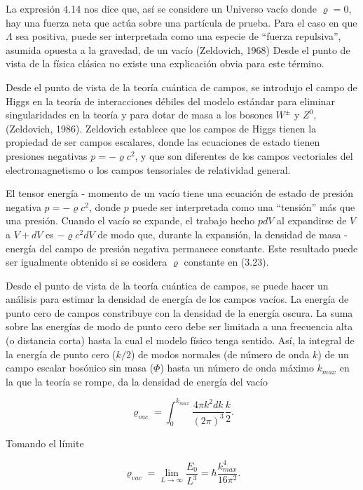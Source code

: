 \documentclass[11pt]{article}
\begin{document}
    La expresión 4.14 nos dice que, así se considere un Universo vacío donde $\varrho=0$, hay una fuerza neta que actúa sobre una partícula de prueba. Para el caso en que $\Lambda$ sea positiva, puede ser interpretada como una especie de ``fuerza repulsiva'', asumida opuesta a la gravedad, de un vacío (Zeldovich, 1968) Desde el punto de vista de la física clásica no existe una explicación obvia para este término. 
    
    Desde el punto de vista de la teoría cuántica de campos, se introdujo el campo de Higgs en la teoría de interacciones débiles del modelo estándar para eliminar singularidades en la teoría y para dotar de masa a los bosones $W^{\pm}$ y $Z^0$,  (Zeldovich, 1986).  Zeldovich establece que los campos de Higgs tienen la propiedad de ser campos escalares, donde las ecuaciones de estado tienen presiones negativas $p=- \varrho c^2$, y que son diferentes de los campos vectoriales del electromagnetismo o los campos tensoriales de relatividad general. 
    
    El tensor energía - momento de un vacío tiene una ecuación de estado de presión negativa $p=- \varrho c^2$, donde $p$ puede ser interpretada como una ``tensión'' más que una presión. Cuando el vacío se expande, el trabajo hecho $p dV$  al expandirse de $V$ a $V + dV$ es $- \varrho c^2 dV$ de modo que, durante la expansión, la densidad de masa - energía del campo de presión negativa permanece constante. Este resultado puede ser igualmente obtenido si se cosidera $\varrho$ constante en (3.23). 
    
    Desde el punto de vista de la teoría cuántica de campos, se puede hacer un análisis para estimar la densidad de energía de los campos vacíos. La energía de punto cero de campos constribuye con la densidad de la energía oscura. La suma sobre las energías de modo de punto cero debe ser limitada a una frecuencia alta (o distancia corta) hasta la cual el modelo físico tenga sentido. Así, la integral de la energía de punto cero ($k/2$) de modos normales (de número de onda $k$) de un campo escalar bosónico sin masa ($\Phi$) hasta un número de onda máximo $k_{max}$ en la que la teoría se rompe, da la densidad de energía del vacío 
    
  \begin{equation}
       \varrho_{vac} = \int_0^{k_{max}}{\frac{4\pi k^2 dk }{(2\pi)^3} \frac{k}{2}}.
  \end{equation}
  
  Tomando el límite
    
   \begin{equation}
       \varrho_{vac} = \lim_{L \to \infty}{\frac{E_0}{L^3}} = \hbar \frac{k^4_{max}}{16 \pi^2}.
   \end{equation}
    
\end{document}
